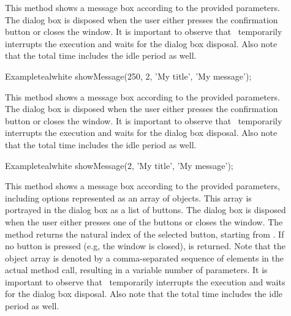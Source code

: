 \begin{description}
\item[]

This method shows a message box according to the provided parameters. The dialog box is disposed when the user either presses the confirmation button or closes the window. It is important to observe that \arara\ temporarily interrupts the execution and waits for the dialog box disposal. Also note that the total time includes the idle period as well.

\begin{codebox}{Example}{teal}{\icnote}{white}
showMessage(250, 2, 'My title', 'My message');
\end{codebox}

\item[]

This method shows a message box according to the provided parameters. The dialog box is disposed when the user either presses the confirmation button or closes the window. It is important to observe that \arara\ temporarily interrupts the execution and waits for the dialog box disposal. Also note that the total time includes the idle period as well.

\begin{codebox}{Example}{teal}{\icnote}{white}
showMessage(2, 'My title', 'My message');
\end{codebox}

\item[]

This method shows a message box according to the provided parameters, including options represented as an array of  objects. This array is portrayed in the dialog box as a list of buttons. The dialog box is disposed when the user either presses one of the buttons or closes the window. The method returns the natural index of the selected button, starting from . If no button is pressed (e.g, the window is closed),  is returned. Note that the object array is denoted by a  comma-separated sequence of elements in the actual method call, resulting in a variable number of parameters. It is important to observe that \arara\ temporarily interrupts the execution and waits for the dialog box disposal. Also note that the total time includes the idle period as well.


\end{description}
